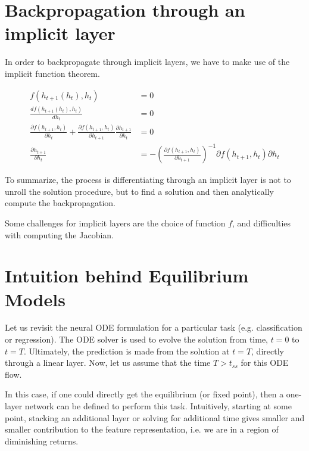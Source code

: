 \documentclass[book.tex]{subfiles}
\begin{document}
\section{Backpropagation through an implicit layer}
In order to backpropagate through implicit layers, we have to make use of the implicit function theorem.

\begin{align*}
f(h_{t+1}(h_t),h_{t}) & = 0\\
\frac{df(h_{t+1}(h_t),h_{t})}{dh_t} & =   0\\
\frac{\partial f(h_{t+1},h_{t})}{\partial h_t} + \frac{\partial f(h_{t+1},h_{t})}{\partial h_{t+1}} \frac{\partial h_{t+1}}{\partial h_t} & = 0\\
\frac{\partial h_{t+1}}{\partial h_t} & =  - \left(\frac{\partial f(h_{t+1},h_{t})}{ \partial h_{t+1}}\right)^{-1} {\partial f(h_{t+1},h_{t})}{\partial h_t}
\end{align*}


To summarize, the process is differentiating through an implicit layer is not to unroll the solution procedure, but to find a solution and then analytically compute the backpropagation.

Some challenges for implicit layers are the choice of function $f$, and difficulties with computing the Jacobian.

\section{Intuition behind Equilibrium Models}



Let us revisit the neural ODE formulation for a particular task (e.g. classification or regression).  The ODE solver is used to evolve the solution from time, $t=0$ to $t=T$. Ultimately, the prediction is made from the solution at $t=T$, directly through a linear layer.  Now, let us assume that the time $T > t_{ss}$ for this ODE flow.

In this case, if one could directly get the equilibrium (or fixed point), then a one-layer network can be defined to perform this task.  Intuitively, starting at some point, stacking an additional layer or solving for additional time gives smaller and smaller contribution to the feature representation, i.e. we are in a region of diminishing returns.  %
\end{document}
